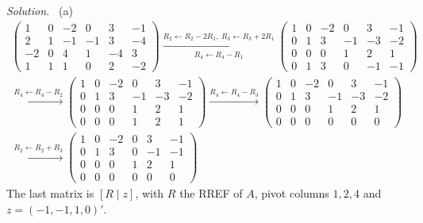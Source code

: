 \documentclass[12pt]{article}
\theoremstyle{definition}
\newenvironment{solution}{\par\noindent\textit{Solution.}\ }{\par\smallskip}
\begin{document}
\begin{solution}
(a)
\[
\begin{gathered}
\left(\begin{array}{ccccc|c}1&0&-2&0&3&-1\\2&1&-1&-1&3&-4\\-2&0&4&1&-4&3\\1&1&1&0&2&-2\end{array}\right)
\xrightarrow[R_4\leftarrow R_4-R_1]{R_2\leftarrow R_2-2R_1,\ R_3\leftarrow R_3+2R_1}
\left(\begin{array}{ccccc|c}1&0&-2&0&3&-1\\0&1&3&-1&-3&-2\\0&0&0&1&2&1\\0&1&3&0&-1&-1\end{array}\right)
\\
\xrightarrow{R_4\leftarrow R_4-R_2}
\left(\begin{array}{ccccc|c}1&0&-2&0&3&-1\\0&1&3&-1&-3&-2\\0&0&0&1&2&1\\0&0&0&1&2&1\end{array}\right)
\xrightarrow{R_4\leftarrow R_4-R_3}
\left(\begin{array}{ccccc|c}1&0&-2&0&3&-1\\0&1&3&-1&-3&-2\\0&0&0&1&2&1\\0&0&0&0&0&0\end{array}\right)
\\
\xrightarrow{R_2\leftarrow R_2+R_3}
\left(\begin{array}{ccccc|c}1&0&-2&0&3&-1\\0&1&3&0&-1&-1\\0&0&0&1&2&1\\0&0&0&0&0&0\end{array}\right)
\end{gathered}
\]
The last matrix is \([R\mid z]\), with \(R\) the RREF of \(A\), pivot columns \(1,2,4\) and \(z=(-1,-1,1,0)'\).


\end{solution}
\end{document}
